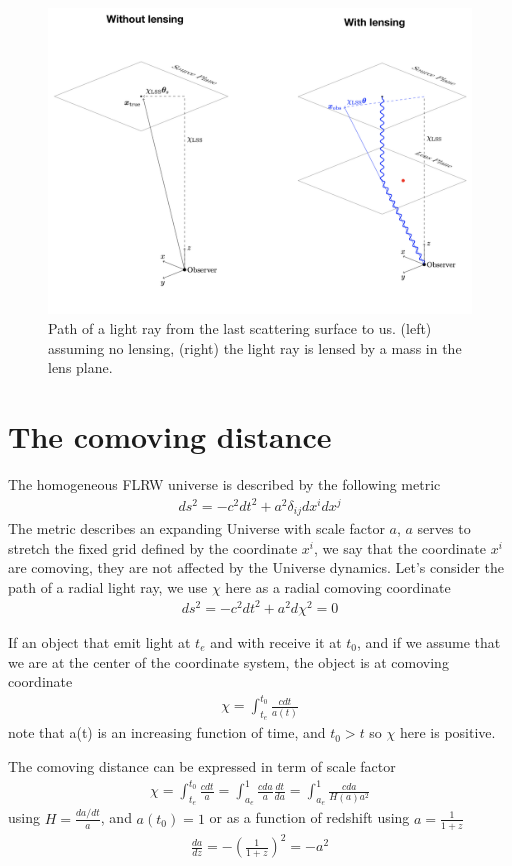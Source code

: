 \documentclass[a4paper, 11pt]{article}
\def\ba{\begin{eqnarray}}
\def\ea{\end{eqnarray}}
\begin{document}
\begin{figure}
  \centering
  \includegraphics[width=1\columnwidth]{lensing.png}
  \caption{Path of a light ray from the last scattering surface to us.  (left) assuming no lensing, (right) the light ray is lensed by a mass in the lens plane.}
  \label{fig:scanningstrat}
\end{figure}



\section{The comoving distance }

The homogeneous FLRW universe is described by the following metric
\ba
ds^{2} = -c^{2}dt^{2} + a^{2}\delta_{ij}dx^{i}dx^{j}
\ea
The metric describes an expanding Universe with scale factor $a$, $a$ serves to stretch the fixed grid defined by the coordinate $x^{i}$, we say that the coordinate $x^{i}$ are comoving, they are not affected by the Universe dynamics. 
Let's consider the path of a radial light ray, we use $\chi$ here as a radial comoving coordinate
\ba
ds^{2} = -c^{2}dt^{2} + a^{2}d\chi^{2} = 0 
\ea

If an object that emit light at $t_{e}$ and with receive it at $t_{0}$, and if we assume that we are at the center of the coordinate system, the object is at comoving coordinate
\ba
\chi = \int_{t_{e}}^{t_{0}} \frac{c dt}{a(t)}
\ea
note that a(t) is an increasing function of time, and $t_{0} > t$ so $\chi$ here is positive.

The comoving distance can be expressed in term of scale factor 
\ba
\chi = \int_{t_{e}}^{t_{0}} \frac{c dt}{a} =  \int_{a_{e}}^{1} \frac{c da}{a} \frac{dt}{da} = \int_{a_{e}}^{1}  \frac{c da}{ H(a) a^{2}} 
\ea
using $H = \frac{da/dt}{a}$, and $a(t_{0}) = 1$ or as a function of redshift using $a = \frac{1}{1+z}$
\ba
\frac{da}{dz} = - \left(\frac{1}{1+z}\right)^{2}= -a^{2}
\ea
\end{document}
